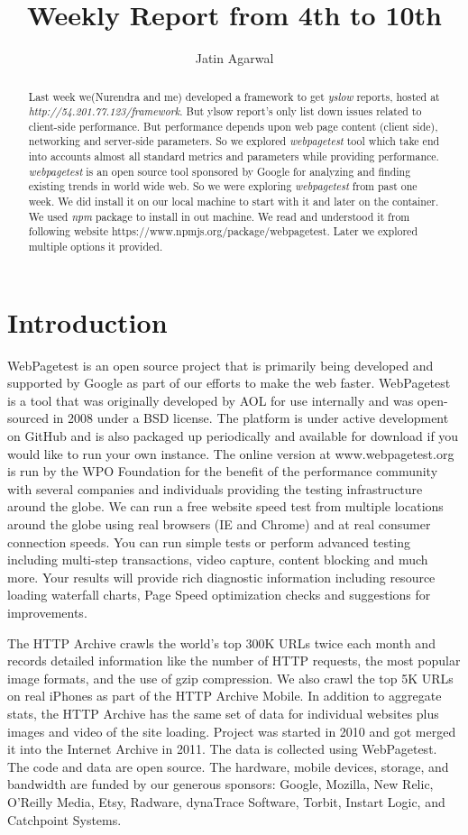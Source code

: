 \documentclass[a4paper,10pt]{article}
\title{Weekly Report from 4th  to 10th}
\author{Jatin Agarwal}
\begin{document}
\maketitle

\begin{abstract}
Last week we(Nurendra and me) developed a framework to get {\it yslow} reports, hosted at {\it http://54.201.77.123/framework}.
But ylsow report's only list down issues related to client-side performance. But performance depends upon  web page content
(client side), networking and server-side parameters. So we explored {\it webpagetest} tool which take end into accounts
almost all standard metrics and parameters while providing performance. {\it webpagetest} is an open source tool sponsored by Google for analyzing
and finding existing trends in world wide web. So we were exploring {\it webpagetest} from past one week. We did install it on our 
local machine to start with it and later on the container. We used {\it npm} package to install in out machine. We read
and understood it from following website https://www.npmjs.org/package/webpagetest. Later we explored multiple options it
provided.
\end{abstract}

\section{Introduction}
WebPagetest is an open source project that is primarily being developed and supported by Google as part of our efforts to make the web faster.
WebPagetest is a tool that was originally developed by AOL for use internally and was open-sourced in 2008 under a BSD license.
The platform is under active development on GitHub and is also packaged up periodically and available for download if you would
like to run your own instance. The online version at www.webpagetest.org is run by the WPO Foundation for the benefit of the 
performance community with several companies and individuals providing the testing infrastructure around the globe.
We can run a free website speed test from multiple locations around the globe using real browsers (IE and Chrome) and at real consumer
connection speeds. You can run simple tests or perform advanced testing including multi-step transactions, video capture, 
content blocking and much more. Your results will provide rich diagnostic information including resource loading waterfall charts,
Page Speed optimization checks and suggestions for improvements.

The HTTP Archive crawls the world’s top 300K URLs twice each month and records detailed information like the number of HTTP requests,
the most popular image formats, and the use of gzip compression. We also crawl the top 5K URLs on real iPhones as part of the HTTP
Archive Mobile. In addition to aggregate stats, the HTTP Archive has the same set of data for individual websites plus images and 
video of the site loading. Project was started in  2010 and got merged it into the Internet Archive in 2011. The data is collected
using WebPagetest. The code and data are open source. The hardware, mobile devices, storage, and bandwidth are funded by our generous
sponsors:  Google, Mozilla, New Relic, O’Reilly Media, Etsy, Radware, dynaTrace Software, Torbit, Instart Logic, and Catchpoint Systems.
\end{document}
